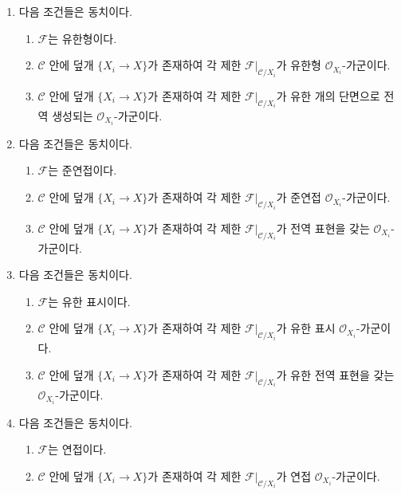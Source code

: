 \begin{lemma}
\begin{enumerate}
\begin{enumerate}
\item $\mathcal{C}$ 안에 덮개 $\{X_i \to X\}$가 존재하여 각 제한
$\mathcal{F}|_{\mathcal{C}/X_i}$가 $r$개의 단면으로 국소 생성되는
$\mathcal{O}_{X_i}$-가군이다.
\item $\mathcal{C}$ 안에 덮개 $\{X_i \to X\}$가 존재하여 각 제한
$\mathcal{F}|_{\mathcal{C}/X_i}$가 $r$개의 단면으로 전역 생성되는
$\mathcal{O}_{X_i}$-가군이다.
\end{enumerate}
\item 다음 조건들은 동치이다.
\begin{enumerate}
\item $\mathcal{F}$는 유한형이다.
\item $\mathcal{C}$ 안에 덮개 $\{X_i \to X\}$가 존재하여 각 제한
$\mathcal{F}|_{\mathcal{C}/X_i}$가 유한형 $\mathcal{O}_{X_i}$-가군이다.
\item $\mathcal{C}$ 안에 덮개 $\{X_i \to X\}$가 존재하여 각 제한
$\mathcal{F}|_{\mathcal{C}/X_i}$가 유한 개의 단면으로 전역 생성되는
$\mathcal{O}_{X_i}$-가군이다.
\end{enumerate}
\item 다음 조건들은 동치이다.
\begin{enumerate}
\item $\mathcal{F}$는 준연접이다.
\item $\mathcal{C}$ 안에 덮개 $\{X_i \to X\}$가 존재하여 각 제한
$\mathcal{F}|_{\mathcal{C}/X_i}$가 준연접 $\mathcal{O}_{X_i}$-가군이다.
\item $\mathcal{C}$ 안에 덮개 $\{X_i \to X\}$가 존재하여 각 제한
$\mathcal{F}|_{\mathcal{C}/X_i}$가 전역 표현을 갖는
$\mathcal{O}_{X_i}$-가군이다.
\end{enumerate}
\item 다음 조건들은 동치이다.
\begin{enumerate}
\item $\mathcal{F}$는 유한 표시이다.
\item $\mathcal{C}$ 안에 덮개 $\{X_i \to X\}$가 존재하여 각 제한
$\mathcal{F}|_{\mathcal{C}/X_i}$가 유한 표시 $\mathcal{O}_{X_i}$-가군이다.
\item $\mathcal{C}$ 안에 덮개 $\{X_i \to X\}$가 존재하여 각 제한
$\mathcal{F}|_{\mathcal{C}/X_i}$가 유한 전역 표현을 갖는
$\mathcal{O}_{X_i}$-가군이다.
\end{enumerate}
\item 다음 조건들은 동치이다.
\begin{enumerate}
\item $\mathcal{F}$는 연접이다.
\item $\mathcal{C}$ 안에 덮개 $\{X_i \to X\}$가 존재하여 각 제한
$\mathcal{F}|_{\mathcal{C}/X_i}$가 연접 $\mathcal{O}_{X_i}$-가군이다.
\end{enumerate}
\end{enumerate}
\end{lemma}

